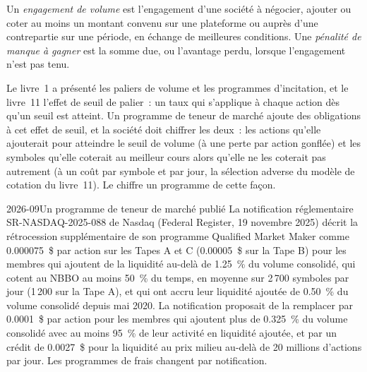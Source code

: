 \begin{definition}\label{def:fm:commercial-relationships-with-venues-brokers-and-vendors:commit}
Un \emph{engagement de volume} est l'engagement d'une société à négocier, ajouter ou coter au moins un montant convenu sur une plateforme ou auprès d'une
contrepartie sur une période, en échange de meilleures conditions. Une \emph{pénalité de manque à gagner} est la somme due, ou l'avantage
perdu, lorsque l'engagement n'est pas tenu.
\end{definition}

Le livre~1 a présenté les paliers de volume et les programmes d'incitation, et le livre~11 l'effet de seuil de palier~: un taux qui s'applique à chaque action dès qu'un seuil est atteint.
Un programme de teneur de marché ajoute des obligations à cet effet de seuil, et la société doit chiffrer les deux~: les actions qu'elle ajouterait pour atteindre le seuil de volume (à une
perte par action gonflée) et les symboles qu'elle coterait au meilleur cours alors qu'elle ne les coterait pas autrement (à un coût par symbole et par jour, la sélection adverse du
modèle de cotation du livre~11). Le  chiffre un programme de cette façon.

\label{lst:fm:commercial-relationships-with-venues-brokers-and-vendors:value}

\begin{dated}{2026-09}{Un programme de teneur de marché publié}\label{dat:fm:commercial-relationships-with-venues-brokers-and-vendors:qmm}
La notification réglementaire SR-NASDAQ-2025-088 de Nasdaq (Federal Register, 19 novembre 2025) décrit la rétrocession supplémentaire de son programme Qualified Market Maker
comme 0.000075~\$ par action sur les Tapes A et C (0.00005~\$ sur la Tape B) pour les membres qui ajoutent de la liquidité au-delà de 1.25~\% du volume consolidé, qui cotent au
NBBO au moins 50~\% du temps, en moyenne sur 2\,700 symboles par jour (1\,200 sur la Tape A), et qui ont accru leur liquidité ajoutée de 0.50~\% du
volume consolidé depuis mai 2020. La notification proposait de la remplacer par 0.0001~\$ par action pour les membres qui ajoutent plus de 0.325~\% du volume consolidé
avec au moins 95~\% de leur activité en liquidité ajoutée, et par un crédit de 0.0027~\$ pour la liquidité au prix milieu au-delà de 20 millions d'actions par jour. Les programmes de frais
changent par notification.
\end{dated}

